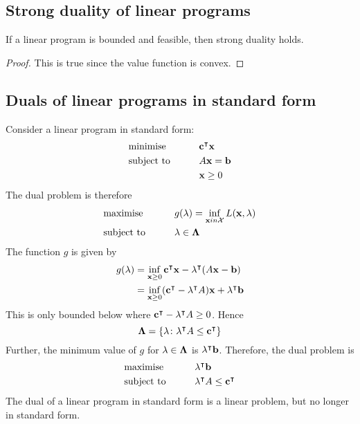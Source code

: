 \subsection{Strong duality of linear programs}
\begin{theorem}
	If a linear program is bounded and feasible, then strong duality holds.
\end{theorem}
\begin{proof}
	This is true since the value function is convex.
\end{proof}

\subsection{Duals of linear programs in standard form}
Consider a linear program in standard form:
\begin{alignat*}{2}
	 & \text{minimise}   & \qquad & \vb c^\intercal \vb x \\
	 & \text{subject to} &        & A \vb x = \vb b        \\
	 &                   &        & \vb x \geq 0
\end{alignat*}
The dual problem is therefore
\begin{alignat*}{2}
	 & \text{maximise}   & \qquad & g(\vb \lambda) = \inf_{\vb x in \mathcal X} L(\vb x, \vb \lambda) \\
	 & \text{subject to} &        & \vb \lambda \in \vb \Lambda                                       \\
\end{alignat*}
The function \( g \) is given by
\begin{align*}
	g(\vb \lambda) & = \inf_{\vb x \geq 0} \vb c^\intercal \vb x - \vb \lambda^\intercal (A \vb x - \vb b)                 \\
	               & = \inf_{\vb x \geq 0} (\vb c^\intercal - \vb \lambda^\intercal A)\vb x + \vb \lambda^\intercal \vb b
\end{align*}
This is only bounded below where \( \vb c^\intercal - \vb \lambda^\intercal A \geq 0 \).
Hence
\[
	\vb \Lambda = \qty{\vb \lambda \colon \vb \lambda^\intercal A \leq \vb c^\intercal}
\]
Further, the minimum value of \( g \) for \( \vb \lambda \in \vb \Lambda \) is \( \vb \lambda^\intercal \vb b \).
Therefore, the dual problem is
\begin{alignat*}{2}
	 & \text{maximise}   & \qquad & \vb \lambda^\intercal \vb b                   \\
	 & \text{subject to} &        & \vb \lambda^\intercal A \leq \vb c^\intercal \\
\end{alignat*}
The dual of a linear program in standard form is a linear problem, but no longer in standard form.

